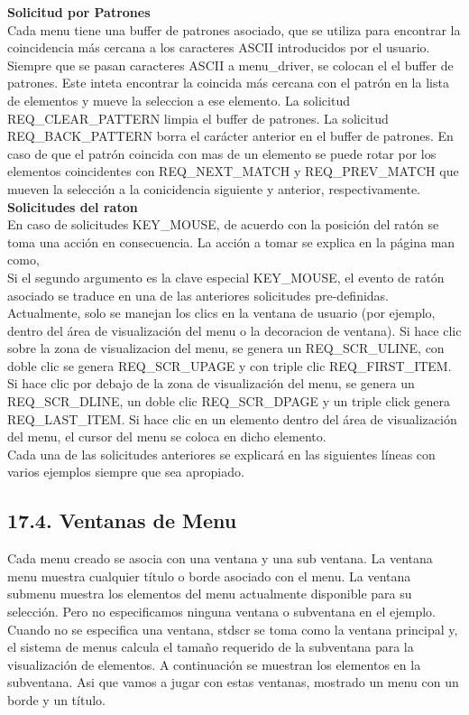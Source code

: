 \documentclass{article}
\begin{document}
\textbf{Solicitud por Patrones}\\
Cada menu tiene una buffer de patrones asociado, que se utiliza para encontrar
la coincidencia más cercana a los caracteres ASCII introducidos por el usuario.
Siempre que se pasan caracteres ASCII a menu\_driver, se colocan el el buffer de
patrones. Este inteta encontrar la coincida más cercana con el patrón en la
lista de elementos y mueve la seleccion a ese elemento. La solicitud
REQ\_CLEAR\_PATTERN limpia el buffer de patrones. La solicitud REQ\_BACK\_PATTERN
borra el carácter anterior en el buffer de patrones. En caso de que el patrón
coincida con mas de un elemento se puede rotar por los elementos coincidentes
con REQ\_NEXT\_MATCH y REQ\_PREV\_MATCH que mueven la selección a la conicidencia
siguiente y anterior, respectivamente.\\

\textbf{Solicitudes del raton}\\
En caso de solicitudes KEY\_MOUSE, de acuerdo con la posición del ratón se toma
una acción en consecuencia. La acción a tomar se explica en la página man como,\\
Si el segundo argumento es la clave especial KEY\_MOUSE, el evento de ratón
asociado se traduce en una de las anteriores solicitudes pre-definidas.
Actualmente, solo se manejan los clics en la ventana de usuario (por ejemplo,
dentro del área de visualización del menu o la decoracion de ventana). Si hace
clic sobre la zona de visualizacion del menu, se genera un REQ\_SCR\_ULINE, con
doble clic se genera REQ\_SCR\_UPAGE y con triple clic REQ\_FIRST\_ITEM. Si hace
clic por debajo de la zona de visualización del menu, se genera un
REQ\_SCR\_DLINE, un doble clic REQ\_SCR\_DPAGE y un triple click genera
REQ\_LAST\_ITEM. Si hace clic en un elemento dentro del área de visualización del
menu, el cursor del menu se coloca en dicho elemento.\\

Cada una de las solicitudes anteriores se explicará en las siguientes líneas
con varios ejemplos siempre que sea apropiado.

\subsection{17.4. Ventanas de Menu}%
Cada menu creado se asocia con una ventana y una sub ventana. La ventana menu
muestra cualquier título o borde asociado con el menu. La ventana submenu
muestra los elementos del menu actualmente disponible para su selección. Pero
no especificamos ninguna ventana o subventana en el ejemplo. Cuando no se
especifica una ventana, stdscr se toma como la ventana principal y, el sistema
de menus calcula el tamaño requerido de la subventana para la visualización de
elementos. A continuación se muestran los elementos en la subventana. Asi que
vamos a jugar con estas ventanas, mostrado un menu con un borde y un título.\\
\end{document}
